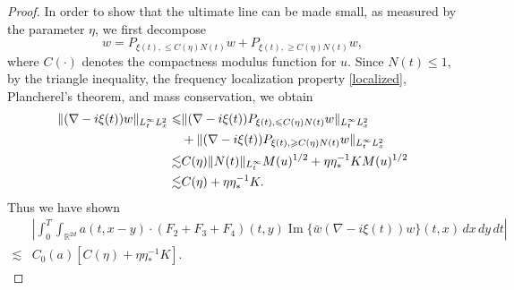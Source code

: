 \documentclass[reqno,11pt]{amsart}
\theoremstyle{plain}
\theoremstyle{definition}
\numberwithin{equation}{section}
\numberwithin{theorem}{section}
\def\le{\leqslant}
\def\geq{\geqslant}
\def\leq{\leqslant}
\begin{document}
\begin{proof}
In order to show that the ultimate line can be made small, as measured by the parameter $\eta$, we first decompose
\[
w = P_{\xi(t), \leq C(\eta)N(t)} w + P_{\xi(t), \geq C(\eta)N(t)} w,
\]
where $C(\cdot)$ denotes the compactness modulus function for $u$. Since $N(t) \leq 1$, by the triangle inequality, the frequency localization property \eqref{localized}, Plancherel's theorem, and mass conservation, we obtain
\begin{align}\label{kineticb}
   \| (\nabla -i\xi(t))w\|_{L_{t}^{\infty}L_{x}^{2}} \notag
\le& \| (\nabla -i\xi(t))P_{\xi(t),\leq C(\eta)N(t)}w\|_{L_{t}^{\infty}L_{x}^{2}} \notag\\
&+\| (\nabla -i\xi(t))P_{\xi(t),\geq C(\eta)N(t)}w\|_{L_{t}^{\infty}L_{x}^{2}} \notag\\
\lesssim& C(\eta)\| N(t)\|_{L_{t}^{\infty}}M(u)^{1/2} + \eta \eta_{\ast}^{-1}KM(u)^{1/2} \notag\\
\lesssim& C(\eta) +\eta \eta_{\ast}^{-1}K. 
\end{align}
Thus we have shown
\begin{align*}
&\left|\int_{0}^{T}\int_{\mathbb{R}^{2d}}a(t,x - y)\cdot (F_{2} + F_{3} + F_{4})(t,y)\operatorname{Im}\{\bar{w} (\nabla -i\xi(t))w\} (t,x)\,dx\,dy\,dt\right| \\
\lesssim& C_0(a)[C(\eta) +\eta \eta_{\ast}^{-1}K].
\end{align*}



\end{proof}
\end{document}
